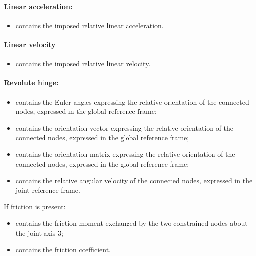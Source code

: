 \paragraph{Linear acceleration:}
\begin{itemize}
\item {} contains the imposed relative linear
  acceleration.
\end{itemize}

\paragraph{Linear velocity}
\begin{itemize}
\item {} contains the imposed relative linear
  velocity.
\end{itemize}

\paragraph{Revolute hinge:}
\begin{itemize}
\item {} contains the Euler angles 
  expressing the relative orientation of the connected nodes, expressed in 
  the global reference frame;
\item {} contains the orientation vector
  expressing the relative orientation of the connected nodes, expressed in 
  the global reference frame;
\item {} contains the orientation matrix
  expressing the relative orientation of the connected nodes, expressed in 
  the global  reference frame;
\item {} contains the relative angular
  velocity of the connected nodes, expressed in the joint reference frame.
\end{itemize}
If friction is present:
\begin{itemize}
\item {} contains the friction moment
  exchanged by the two constrained nodes about the joint axis 3;
\item {} contains the friction coefficient.
\end{itemize}

